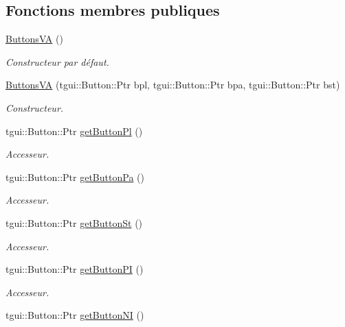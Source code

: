 \subsection*{Fonctions membres publiques}
\begin{DoxyCompactItemize}
\item 
\hypertarget{classButtonsVA_a45d0a219e4eb7b0c28ce47fd6d6829d7}{\hyperlink{classButtonsVA_a45d0a219e4eb7b0c28ce47fd6d6829d7}{Buttons\+V\+A} ()}\label{classButtonsVA_a45d0a219e4eb7b0c28ce47fd6d6829d7}

\begin{DoxyCompactList}\small\item\em Constructeur par défaut. \end{DoxyCompactList}\item 
\hyperlink{classButtonsVA_a146e69faf1e042093a69c2800b35c55b}{Buttons\+V\+A} (tgui\+::\+Button\+::\+Ptr bpl, tgui\+::\+Button\+::\+Ptr bpa, tgui\+::\+Button\+::\+Ptr bst)
\begin{DoxyCompactList}\small\item\em Constructeur. \end{DoxyCompactList}\item 
tgui\+::\+Button\+::\+Ptr \hyperlink{classButtonsVA_a7c7a96011dc82bc8b57d0b84692ea52b}{get\+Button\+Pl} ()
\begin{DoxyCompactList}\small\item\em Accesseur. \end{DoxyCompactList}\item 
tgui\+::\+Button\+::\+Ptr \hyperlink{classButtonsVA_ab222321660bfaed75d89645fa0ac37a0}{get\+Button\+Pa} ()
\begin{DoxyCompactList}\small\item\em Accesseur. \end{DoxyCompactList}\item 
tgui\+::\+Button\+::\+Ptr \hyperlink{classButtonsVA_aad5dc82aec106cb00f78c92110daad0c}{get\+Button\+St} ()
\begin{DoxyCompactList}\small\item\em Accesseur. \end{DoxyCompactList}\item 
tgui\+::\+Button\+::\+Ptr \hyperlink{classButtonsVA_a625dec1c4ede8100580e957ddac22a17}{get\+Button\+P\+I} ()
\begin{DoxyCompactList}\small\item\em Accesseur. \end{DoxyCompactList}\item 
tgui\+::\+Button\+::\+Ptr \hyperlink{classButtonsVA_a15145a6402d6a4688a9c50a5c4fae630}{get\+Button\+N\+I} ()

\end{DoxyCompactItemize}
